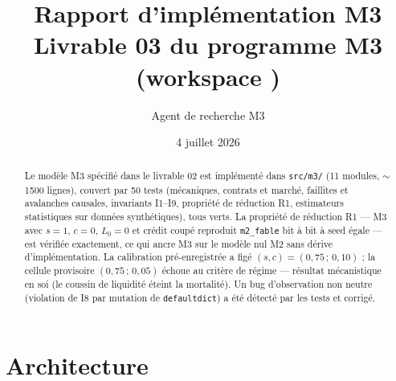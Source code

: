 \documentclass[11pt,a4paper]{article}
\title{Rapport d'implémentation M3\\
\large Livrable 03 du programme M3 (workspace \code{m3\_credit\_soc})}
\author{Agent de recherche M3}
\date{4 juillet 2026}
\newcommand{\code}[1]{\texttt{#1}}
\begin{document}
\maketitle

\begin{abstract}
Le modèle M3 spécifié dans le livrable 02 est implémenté dans
\code{src/m3/} (11 modules, $\sim$1500 lignes), couvert par 50 tests
(mécaniques, contrats et marché, faillites et avalanches causales,
invariants I1--I9, propriété de réduction R1, estimateurs statistiques sur
données synthétiques), tous verts. La propriété de réduction R1 --- M3 avec
$s{=}1$, $c{=}0$, $L_0{=}0$ et crédit coupé reproduit \code{m2\_fable} bit à
bit à seed égale --- est vérifiée exactement, ce qui ancre M3 sur le modèle
nul M2 sans dérive d'implémentation. La calibration pré-enregistrée a figé
$(s, c) = (0{,}75\,;\,0{,}10)$ ; la cellule provisoire $(0{,}75\,;\,0{,}05)$
échoue au critère de régime --- résultat mécanistique en soi (le coussin de
liquidité éteint la mortalité). Un bug d'observation non neutre (violation
de I8 par mutation de \code{defaultdict}) a été détecté par les tests et
corrigé.
\end{abstract}

\section{Architecture}
\end{document}

